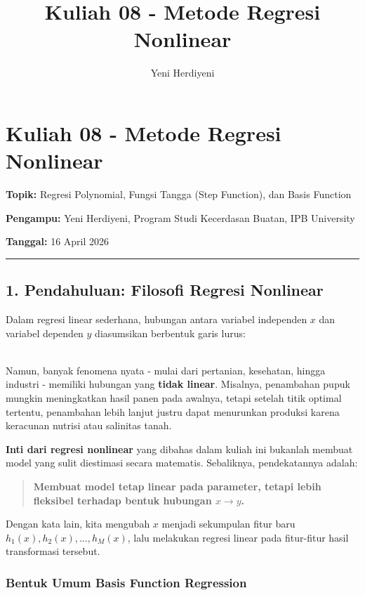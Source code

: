 \documentclass[12pt,a4paper]{article}
\title{Kuliah 08 - Metode Regresi Nonlinear}
\author{Yeni Herdiyeni}
\date{}
\begin{document}
\maketitle
\tableofcontents
\newpage

\section{Kuliah 08 - Metode Regresi Nonlinear}

\textbf{Topik:} Regresi Polynomial, Fungsi Tangga (Step Function), dan Basis Function  

\textbf{Pengampu:} Yeni Herdiyeni, Program Studi Kecerdasan Buatan, IPB University  

\textbf{Tanggal:} 16 April 2026


\hrule


\subsection{1. Pendahuluan: Filosofi Regresi Nonlinear}

Dalam regresi linear sederhana, hubungan antara variabel independen $x$ dan variabel dependen $y$ diasumsikan berbentuk garis lurus:


\\[
\hat{y} = \beta_0 + \beta_1 x
\\]


Namun, banyak fenomena nyata - mulai dari pertanian, kesehatan, hingga industri - memiliki hubungan yang \textbf{tidak linear}. Misalnya, penambahan pupuk mungkin meningkatkan hasil panen pada awalnya, tetapi setelah titik optimal tertentu, penambahan lebih lanjut justru dapat menurunkan produksi karena keracunan nutrisi atau salinitas tanah.


\textbf{Inti dari regresi nonlinear} yang dibahas dalam kuliah ini bukanlah membuat model yang sulit diestimasi secara matematis. Sebaliknya, pendekatannya adalah:


\begin{quote}
\textbf{Membuat model tetap linear pada parameter, tetapi lebih fleksibel terhadap bentuk hubungan $x \rightarrow y$.}\end{quote}


Dengan kata lain, kita mengubah $x$ menjadi sekumpulan fitur baru $h_1(x), h_2(x), \dots, h_M(x)$, lalu melakukan regresi linear pada fitur-fitur hasil transformasi tersebut.


\subsubsection{Bentuk Umum Basis Function Regression}
\end{document}
